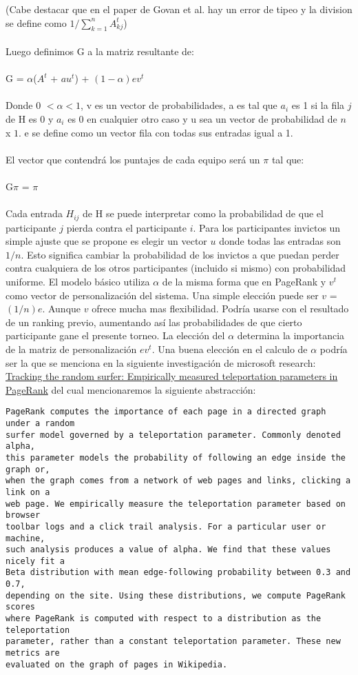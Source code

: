 (Cabe destacar que en el paper de Govan et al. hay un error de tipeo y la division se define como  $1 / \sum\limits_{k=1}^n A^t_{kj}$)
\\\\
Luego definimos G a la matriz resultante de:
\\\\
G = $\alpha$($A^t$ + $au^t$) + $(1 - \alpha)ev^t$
\\\\
Donde 0 $< \alpha < 1$, v es un vector de probabilidades, a es tal que $a_i$ es 1 si la fila $j$ de H es 0 y $a_i$ es 0 en cualquier otro caso y u sea un vector de probabilidad de $n$ x $1$. e se define como un vector fila con todas sus entradas igual a 1.
\\\\
El vector que contendrá los puntajes de cada equipo será un $\pi$ tal que:
\\\\
G$\pi$ = $\pi$ 
\\\\
Cada entrada $H_{ij}$ de H se puede interpretar como la probabilidad de que el participante $j$ pierda contra el participante $i$. Para los participantes invictos un simple ajuste que se propone es elegir un vector $u$ donde todas las entradas son $1/n$. Esto significa cambiar la probabilidad de los invictos a que puedan perder contra cualquiera de los otros participantes (incluido si mismo) con probabilidad uniforme.
El modelo básico utiliza $\alpha$ de la misma forma que en PageRank y $v^t$ como vector de personalización del sistema. Una simple elección puede ser $v$ = $(1/n)e$. Aunque $v$ ofrece mucha mas flexibilidad. Podría usarse con el resultado de un ranking previo, aumentando así las probabilidades de que cierto participante gane el presente torneo.
La elección del $\alpha$ determina la importancia de la matriz de personalización $ev^t$. Una buena elección en el calculo de $\alpha$ podría ser la que se menciona en la siguiente investigación de microsoft research: \href{http://research.microsoft.com/apps/pubs/default.aspx?id=118374}{
Tracking the random surfer: Empirically measured teleportation parameters in PageRank} del cual mencionaremos la siguiente abstracción:

\begin{verbatim}
PageRank computes the importance of each page in a directed graph under a random
surfer model governed by a teleportation parameter. Commonly denoted alpha, 
this parameter models the probability of following an edge inside the graph or, 
when the graph comes from a network of web pages and links, clicking a link on a 
web page. We empirically measure the teleportation parameter based on browser 
toolbar logs and a click trail analysis. For a particular user or machine, 
such analysis produces a value of alpha. We find that these values nicely fit a 
Beta distribution with mean edge-following probability between 0.3 and 0.7, 
depending on the site. Using these distributions, we compute PageRank scores 
where PageRank is computed with respect to a distribution as the teleportation 
parameter, rather than a constant teleportation parameter. These new metrics are 
evaluated on the graph of pages in Wikipedia.
\end{verbatim}

